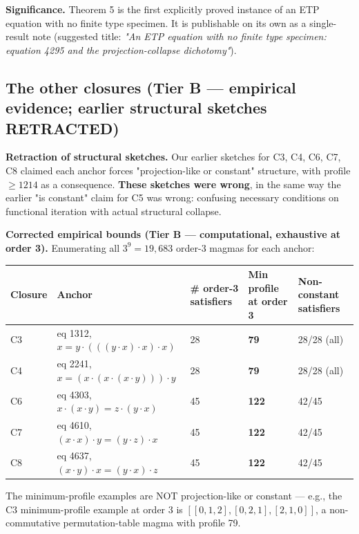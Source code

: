 \documentclass[11pt,reqno]{amsart}
\theoremstyle{plain}
\theoremstyle{definition}
\begin{document}
\textbf{Significance.} Theorem 5 is the first explicitly proved instance of an ETP equation with no finite type specimen. It is publishable on its own as a single-result note (suggested title: \textit{"An ETP equation with no finite type specimen: equation 4295 and the projection-collapse dichotomy"}).

\subsection{The other closures (Tier B --- empirical evidence; earlier structural sketches RETRACTED)}

\textbf{Retraction of structural sketches.} Our earlier sketches for C3, C4, C6, C7, C8 claimed each anchor forces "projection-like or constant" structure, with profile $\geq 1214$ as a consequence. \textbf{These sketches were wrong}, in the same way the earlier "is constant" claim for C5 was wrong: confusing necessary conditions on functional iteration with actual structural collapse.

\textbf{Corrected empirical bounds (Tier B --- computational, exhaustive at order 3).} Enumerating all $3^9 = 19{,}683$ order-3 magmas for each anchor:

\begin{center}
\begin{tabular}{lllll}
\toprule
Closure & Anchor & # order-3 satisfiers & Min profile at order 3 & Non-constant satisfiers \\
\midrule
C3 & eq 1312, $x = y \cdot (((y \cdot x) \cdot x) \cdot x)$ & 28 & \textbf{79} & 28/28 (all) \\
C4 & eq 2241, $x = (x \cdot (x \cdot (x \cdot y))) \cdot y$ & 28 & \textbf{79} & 28/28 (all) \\
C6 & eq 4303, $x \cdot (x \cdot y) = z \cdot (y \cdot x)$ & 45 & \textbf{122} & 42/45 \\
C7 & eq 4610, $(x \cdot x) \cdot y = (y \cdot z) \cdot x$ & 45 & \textbf{122} & 42/45 \\
C8 & eq 4637, $(x \cdot y) \cdot x = (y \cdot x) \cdot z$ & 45 & \textbf{122} & 42/45 \\
\bottomrule
\end{tabular}
\end{center}

The minimum-profile examples are NOT projection-like or constant --- e.g., the C3 minimum-profile example at order 3 is $[[0, 1, 2], [0, 2, 1], [2, 1, 0]]$, a non-commutative permutation-table magma with profile 79.
\end{document}
